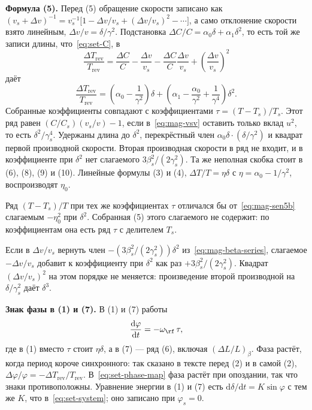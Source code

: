 \textbf{Формула (5).}
Перед (5) обращение скорости записано как $(v_s+\Delta v)^{-1}=v_s^{-1}\bigl[1-\Delta v/v_s+(\Delta v/v_s)^2-\cdots\bigr]$, а само отклонение скорости взято линейным, $\Delta v/v=\delta/\gamma^2$. Подстановка $\Delta C/C=\alpha_0\delta+\alpha_1\delta^2$, то есть той же записи длины, что~\eqref{eq:set-C}, в
\begin{equation}
\label{eq:mag-sen5}
\frac{\Delta T_{\mathrm{rev}}}{T_{\mathrm{rev}}}
=\frac{\Delta C}{C}-\frac{\Delta v}{v_s}
-\frac{\Delta C}{C}\frac{\Delta v}{v_s}
+\left(\frac{\Delta v}{v_s}\right)^2
\end{equation}
даёт
\begin{equation}
\label{eq:mag-sen5b}
\frac{\Delta T_{\mathrm{rev}}}{T_{\mathrm{rev}}}
=\left(\alpha_0-\frac{1}{\gamma^2}\right)\delta
+\left(\alpha_1-\frac{\alpha_0}{\gamma^2}+\frac{1}{\gamma^4}\right)\delta^2.
\end{equation}
Собранные коэффициенты совпадают с коэффициентами $\tau=(T-T_s)/T_s$. Этот ряд равен $(C/C_s)(v_s/v)-1$, если в~\eqref{eq:mag-vsv} оставить только вклад $u^2$, то есть $\delta^2/\gamma_s^4$. Удержаны длина до $\delta^2$, перекрёстный член $\alpha_0\delta\cdot(\delta/\gamma^2)$ и квадрат первой производной скорости. Вторая производная скорости в ряд не входит, и в коэффициенте при $\delta^2$ нет слагаемого $3\beta_s^2/(2\gamma_s^2)$. Та же неполная скобка стоит в (6), (8), (9) и (10). Линейные формулы (3) и (4), $\Delta T/T=\eta\delta$ с $\eta=\alpha_0-1/\gamma^2$, воспроизводят $\eta_0$.

Ряд $(T-T_s)/T$ при тех же коэффициентах $\tau$ отличался бы от~\eqref{eq:mag-sen5b} слагаемым $-\eta_0^2$ при $\delta^2$. Собранная (5) этого слагаемого не содержит: по коэффициентам она есть ряд $\tau$ с делителем $T_s$.

Если в $\Delta v/v_s$ вернуть член $-(3\beta_s^2/(2\gamma_s^2))\delta^2$ из~\eqref{eq:mag-beta-series}, слагаемое $-\Delta v/v_s$ добавит к коэффициенту при $\delta^2$ как раз $+3\beta_s^2/(2\gamma_s^2)$. Квадрат $(\Delta v/v_s)^2$ на этом порядке не меняется: произведение второй производной на $\delta/\gamma_s^2$ даёт $\delta^3$.

\textbf{Знак фазы в (1) и (7).}
В (1) и (7) работы~\cite{Senichev2013}
\begin{equation}
\label{eq:mag-sen-phase}
\frac{\mathrm{d}\varphi}{\mathrm{d}t}=-\omega_\rf\,\tau,
\end{equation}
где в (1) вместо $\tau$ стоит $\eta\delta$, а в (7) --- ряд (6), включая $(\Delta L/L)_\beta$. Фаза растёт, когда период короче синхронного: так сказано в тексте перед (2) и в самой (2), $\Delta\varphi/\varphi=-\Delta T_{\mathrm{rev}}/T_{\mathrm{rev}}$. В~\eqref{eq:set-phase-map} фаза растёт при опоздании, так что знаки противоположны. Уравнение энергии в (1) и (7) есть $\mathrm{d}\delta/\mathrm{d}t=K\sin\varphi$ с тем же $K$, что в~\eqref{eq:set-system}; оно записано при $\varphi_s=0$.

